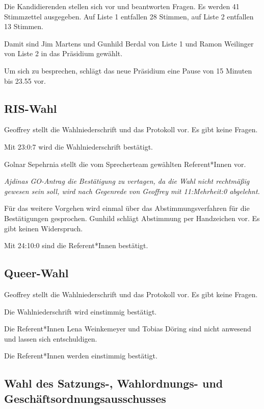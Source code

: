 \documentclass[ngerman,headheight=70pt]{scrartcl}
\begin{document}
    Die Kandidierenden stellen sich vor und beantworten Fragen.
    Es werden 41 Stimmzettel ausgegeben.
    Auf Liste 1 entfallen 28 Stimmen, auf Liste 2 entfallen 13 Stimmen.

    Damit sind Jim Martens und Gunhild Berdal von Liste 1 und Ramon Weilinger
    von Liste 2 in das Präsidium gewählt.

    Um sich zu besprechen, schlägt das neue Präsidium eine Pause von 15 Minuten
    bis 23.55 vor.

    \subsection{RIS-Wahl}

    Geoffrey stellt die Wahlniederschrift und das Protokoll vor. Es gibt
    keine Fragen.

    Mit 23:0:7 wird die Wahlniederschrift bestätigt.

    Golnar Sepehrnia stellt die vom Sprecherteam gewählten Referent*Innen vor.

    \textit{Ajdinas GO-Antrag die Bestätigung zu vertagen, da die Wahl nicht
    rechtmäßig gewesen sein soll, wird nach Gegenrede von Geoffrey mit
    11:Mehrheit:0 abgelehnt.}

    Für das weitere Vorgehen wird einmal über das Abstimmungsverfahren für die
    Bestätigungen gesprochen. Gunhild schlägt Abstimmung per Handzeichen vor.
    Es gibt keinen Widerspruch.

    Mit 24:10:0 sind die Referent*Innen bestätigt.

    \subsection{Queer-Wahl}

    Geoffrey stellt die Wahlniederschrift und das Protokoll vor. Es gibt
    keine Fragen.

    Die Wahlniederschrift wird einstimmig bestätigt.

    Die Referent*Innen Lena Weinkemeyer und Tobias Döring sind nicht anwesend
    und lassen sich entschuldigen.

    Die Referent*Innen werden einstimmig bestätigt.

    \subsection{Wahl des Satzungs-, Wahlordnungs- und Geschäftsordnungsausschusses}
\end{document}
